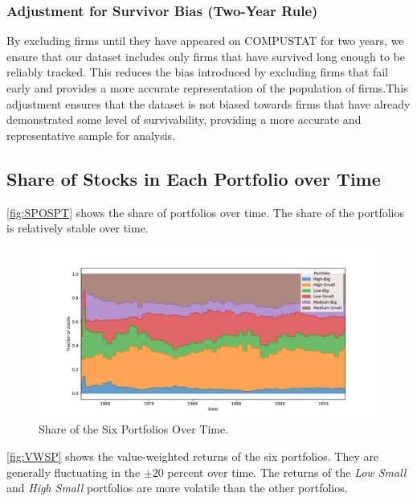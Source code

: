 \documentclass[a4paper,10pt,american]{article}
\begin{document}
\subsubsection*{Adjustment for Survivor Bias (Two-Year Rule)}
By excluding firms until they have appeared on COMPUSTAT for two years,
we ensure that our dataset includes only firms that have survived long 
enough to be reliably tracked. This reduces the bias introduced by 
excluding firms that fail early and provides a more accurate representation
of the population of firms.This adjustment ensures that the dataset is not 
biased towards firms that have already demonstrated some level of 
survivability, providing a more accurate and representative sample 
for analysis.

\subsection*{Share of Stocks in Each Portfolio over Time}

\autoref{fig:SPOSPT} shows the share of portfolios over time. The share of
the portfolios is relatively stable over time.

\begin{figure}[H]
\centering
\includegraphics[width=1\linewidth]{../Plots/portfolio_shares_v2.pdf}
\caption{Share of the Six Portfolios Over Time.}
\label{fig:SPOSPT}
\end{figure}

\autoref{fig:VWSP} shows the value-weighted returns of the six portfolios.
They are generally fluctuating in the $\pm 20$ percent over time. The returns
of the \textit{Low Small} and \textit{High Small} portfolios are more
volatile than the other portfolios.
\end{document}
